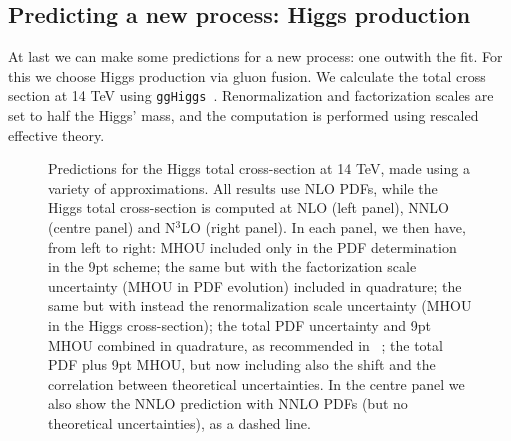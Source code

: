 \subsection{Predicting a new process: Higgs production}
\label{subsec:higgs}
At last we can make some predictions for a new process: one outwith the fit. For this we choose Higgs production via gluon fusion. We calculate the total cross section at 14 TeV using {\tt  ggHiggs}~\cite{Ball:2013bra,Bonvini:2014jma,Bonvini:2016frm}.
Renormalization and factorization scales are set to half the Higgs' mass, and the computation is performed using rescaled effective theory.

\begin{figure}[h]
    \begin{center}
    \end{center}
  \vspace{-0.55cm}
  \caption{Predictions for the Higgs total cross-section at 14 TeV, made using a variety of approximations. All results use NLO PDFs, while the Higgs total cross-section is computed at NLO (left panel), NNLO (centre panel) and N$^3$LO (right panel). In each panel, we then have, from left to right: MHOU included only in the PDF determination in the 9pt scheme; the same but with the factorization scale uncertainty (MHOU in PDF evolution) included in quadrature; the same but with instead the renormalization scale uncertainty (MHOU in the Higgs cross-section); the total PDF uncertainty and 9pt MHOU combined in quadrature, as recommended in ~\cite{AbdulKhalek:2019ihb}; the total PDF plus 9pt MHOU, but now including also the shift and the correlation between theoretical uncertainties. In the centre panel we also show the NNLO prediction with NNLO PDFs (but no theoretical uncertainties), as a dashed line. }
  \label{fig:Higgs}
\end{figure}

